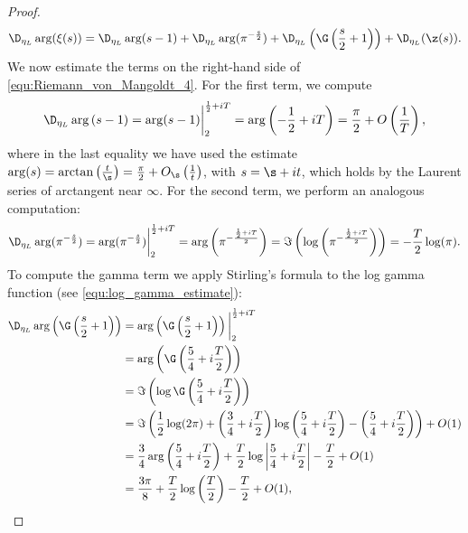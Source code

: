\begin{proof}
        \begin{equation}\label{equ:Riemann_von_Mangoldt_4}
          \D_{\eta_{L}}\arg(\xi(s)) = \D_{\eta_{L}}\arg(s-1)+\D_{\eta_{L}}\arg(\pi^{-\frac{s}{2}})+\D_{\eta_{L}}\left(\G\left(\frac{s}{2}+1\right)\right)+\D_{\eta_{L}}(\z(s)).
        \end{equation}
        We now estimate the terms on the right-hand side of \cref{equ:Riemann_von_Mangoldt_4}. For the first term, we compute
        \begin{equation}\label{equ:Riemann_von_Mangoldt_5}
          \D_{\eta_{L}}\arg\left(s-1\right) = \arg(s-1)\bigg|_{2}^{\frac{1}{2}+iT} = \arg\left(-\frac{1}{2}+iT\right) = \frac{\pi}{2}+O\left(\frac{1}{T}\right),
        \end{equation}
        where in the last equality we have used the estimate $\arg(s) = \arctan\left(\frac{t}{\s}\right) = \frac{\pi}{2}+O_{\s}\left(\frac{1}{t}\right)$, with $s = \s+it$, which holds by the Laurent series of arctangent near $\infty$. For the second term, we perform an analogous computation:
        \begin{equation}\label{equ:Riemann_von_Mangoldt_6}
          \D_{\eta_{L}}\arg(\pi^{-\frac{s}{2}}) = \arg(\pi^{-\frac{s}{2}})\bigg|_{2}^{\frac{1}{2}+iT} = \arg\left(\pi^{-\frac{\frac{1}{2}+iT}{2}}\right) = \Im\left(\log\left(\pi^{-\frac{\frac{1}{2}+iT}{2}}\right)\right) = -\frac{T}{2}\log(\pi).
        \end{equation}
        To compute the gamma term we apply Stirling's formula to the log gamma function (see \cref{equ:log_gamma_estimate}):
        \begin{equation}\label{equ:Riemann_von_Mangoldt_7}
          \begin{aligned}
            \D_{\eta_{L}}\arg\left(\G\left(\frac{s}{2}+1\right)\right) &= \arg\left(\G\left(\frac{s}{2}+1\right)\right)\bigg|_{2}^{\frac{1}{2}+iT} \\
            &= \arg\left(\G\left(\frac{5}{4}+i\frac{T}{2}\right)\right) \\
            &= \Im\left(\log\G\left(\frac{5}{4}+i\frac{T}{2}\right)\right) \\
            &= \Im\left(\frac{1}{2}\log(2\pi)+\left(\frac{3}{4}+i\frac{T}{2}\right)\log\left(\frac{5}{4}+i\frac{T}{2}\right)-\left(\frac{5}{4}+i\frac{T}{2}\right)\right)+O(1) \\
            &= \frac{3}{4}\arg\left(\frac{5}{4}+i\frac{T}{2}\right)+\frac{T}{2}\log\left|\frac{5}{4}+i\frac{T}{2}\right|-\frac{T}{2}+O(1) \\
            &= \frac{3\pi}{8}+\frac{T}{2}\log\left(\frac{T}{2}\right)-\frac{T}{2}+O(1),

\end{aligned}
\end{equation}
\end{proof}
